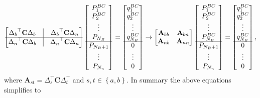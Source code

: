 \documentclass[%
 amsmath,amssymb,
prstper,
]{revtex4-2}
\begin{document}
\begin{align}
 \begin{bmatrix} {\Delta_{b}}^\top \mathbf{C} {\Delta_{b}}  & \vline &    {\Delta_{b}}^\top \mathbf{C} {\Delta_{n}} \\ \hline  
    {\Delta_{n}}^\top \mathbf{C} {\Delta_{b}} & \vline & {\Delta_{n}}^\top \mathbf{C} {\Delta_{n}}
    \end{bmatrix} \begin{bmatrix} P^{BC}_1 \\ P^{BC}_2 \\ \vdots \\ P_{N_B} \\  \hline  P_{N_B+1} \\ \vdots \\ P_{N_n}
    \end{bmatrix} = \begin{bmatrix} q^{BC}_1 \\ q^{BC}_2 \\ \vdots \\ q^{BC}_{N_B} \\ \hline  0 \\ \vdots \\ 0\end{bmatrix} \to 
    \begin{bmatrix} 
    \mathbf{A}_{bb} & \mathbf{A}_{bn} \\
    \mathbf{A}_{nb} & \mathbf{A}_{nn}       
    \end{bmatrix} \begin{bmatrix} P^{BC}_1 \\ P^{BC}_2 \\ \vdots \\ P^{BC}_{N_B} \\ \hline  P_{N_B+1} \\ \vdots \\ P_{N_n}
    \end{bmatrix} = \begin{bmatrix} q^{BC}_1 \\ q^{BC}_2 \\ \vdots \\ q^{BC}_{N_B}  \\ \hline  0 \\ \vdots \\ 0\end{bmatrix}, 
\end{align}
%
where $\mathbf{A}_{st} = \Delta^\top_s \mathbf{C}\Delta^\top_t$ and  $s,t\in\left\{a,b\right\}$. In summary the above equations simplifies to 
\end{document}
